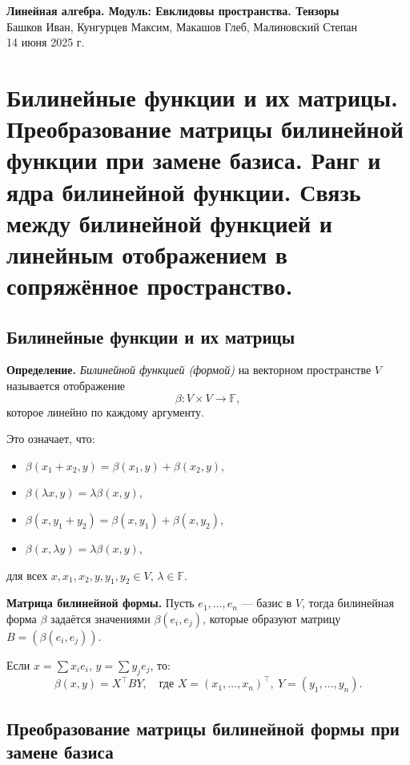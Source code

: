 \documentclass[12pt]{article}
\begin{document}
\begin{center}
    {\LARGE \textbf{Линейная алгебра. Модуль: Евклидовы пространства. Тензоры}}\\
    \vspace{0.3em}
    Башков Иван, Кунгурцев Максим, Макашов Глеб, Малиновский Степан\\
    \vspace{0.3em}
    14 июня 2025 г.
\end{center}

\section{Билинейные функции и их матрицы. Преобразование матрицы билинейной функции при замене базиса. Ранг и ядра билинейной функции. Связь между билинейной функцией и линейным отображением в сопряжённое пространство.}

\subsection{Билинейные функции и их матрицы}

\textbf{Определение.} \textit{Билинейной функцией (формой)} на векторном пространстве $V$ называется отображение 
\[
\beta: V \times V \to \mathbb{F},
\]
которое линейно по каждому аргументу.

Это означает, что:
\begin{itemize}
    \item $\beta(x_1 + x_2, y) = \beta(x_1, y) + \beta(x_2, y)$,
    \item $\beta(\lambda x, y) = \lambda \beta(x, y)$,
    \item $\beta(x, y_1 + y_2) = \beta(x, y_1) + \beta(x, y_2)$,
    \item $\beta(x, \lambda y) = \lambda \beta(x, y)$,
\end{itemize}
для всех $x, x_1, x_2, y, y_1, y_2 \in V$, $\lambda \in \mathbb{F}$.

\vspace{0.5em}
\textbf{Матрица билинейной формы.} Пусть $e_1, \dots, e_n$ — базис в $V$, тогда билинейная форма $\beta$ задаётся значениями $\beta(e_i, e_j)$, которые образуют матрицу $B = (\beta(e_i, e_j))$.

Если $x = \sum x_i e_i$, $y = \sum y_j e_j$, то:
\[
\beta(x, y) = X^\top B Y, \quad \text{где } X = (x_1, \dots, x_n)^\top,\ Y = (y_1, \dots, y_n).
\]

\subsection{Преобразование матрицы билинейной формы при замене базиса}
\end{document}
